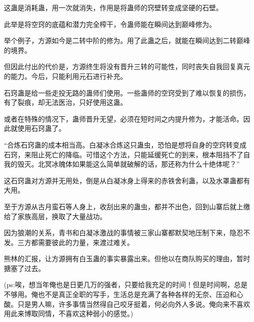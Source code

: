 \begin{this_body}
这蛊是消耗蛊，用一次就消失，作用是将蛊师的窍壁转变成坚硬的石壁。

此举是将空窍的底蕴和潜力完全榨干，令蛊师能在瞬间达到巅峰修为。

举个例子，方源如今是二转中阶的修为。用了此蛊之后，就能在瞬间达到二转巅峰的境界。

但因此付出的代价是，方源终生将没有晋升三转的可能性，同时丧失自我回复真元的能力。今后，只能利用元石进行补充。

石窍蛊是给一些走投无路的蛊师们使用。一些蛊师的空窍受到了难以恢复的损伤，有了裂痕，却无法医治，只好使用这蛊。

或者在特殊的情况下，蛊师晋升无望，必须在短时间之内提升修为，才能活命。因此就使用石窍蛊了。

“合炼石窍蛊的成本相当高。白凝冰合炼这只蛊虫，恐怕是想将自身的空窍转变成石窍，来阻止死亡的降临。可惜这个方法，只能延缓死亡的到来，根本阻挡不了自我的毁灭。北冥冰魄体如果能这么简单就破解的话，那还称为什么十绝体呢？”

这石窍蛊对方源并无用处，倒是从白凝冰身上得来的赤铁舍利蛊，以及水罩蛊都有大用。

至于方源从古月蛮石等人身上，收刮出来的蛊虫，都并不出色，回到山寨后就上缴给了家族高层，换取了大量战功。

因为狼潮的关系，青书和白凝冰激战的事情被三家山寨都默契地压制下来，隐忍不发。三方都需要彼此的力量，来渡过难关。

熊林的汇报，让方源拥有白玉蛊的事实暴露出来。但他以在商队购买的理由，暂时搪塞了过去。

(ps:唉，想当年俺也是日更几万的强者，只要给我充足的时间！但是时间啊，总是不够用。俺也不是真正全职的写手，生活总是充满了各种各样的无奈、压迫和心酸。只是男人嘛，许多事情当然得自己咬牙挺着，何必向外人多说。俺向来不喜欢用此来博取同情，不喜欢这种弱小的感觉。)

\end{this_body}


